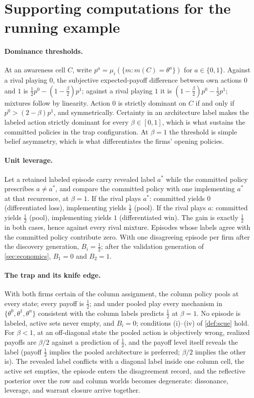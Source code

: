 \section{Supporting computations for the running example}
\label{app:example}

\paragraph{Dominance thresholds.}
At an awareness cell $C$, write $p^a=\mu_i(\{m:m(C)=\theta^a\})$ for
$a\in\{0,1\}$.  Against a rival playing $0$, the subjective expected-payoff
difference between own actions $0$ and $1$ is
$\tfrac12p^0-(1-\tfrac{\beta}{2})p^1$; against a rival playing $1$ it is
$(1-\tfrac{\beta}{2})p^0-\tfrac12p^1$; mixtures follow by linearity.  Action
$0$ is strictly dominant on $C$ if and only if $p^0>(2-\beta)p^1$, and
symmetrically.  Certainty in an architecture label makes the labeled action
strictly dominant for every $\beta\in[0,1]$, which is what sustains the
committed policies in the trap configuration.  At $\beta=1$ the threshold is
simple belief asymmetry, which is what differentiates the firms' opening
policies.

\paragraph{Unit leverage.}
Let a retained labeled episode carry revealed label $a^{*}$ while the
committed policy prescribes $a\neq a^{*}$, and compare the committed policy
with one implementing $a^{*}$ at that recurrence, at $\beta=1$.  If the
rival plays $a^{*}$: committed yields $0$ (differentiated loss),
implementing yields $\tfrac12$ (pool).  If the rival plays $a$: committed
yields $\tfrac12$ (pool), implementing yields $1$ (differentiated win).  The
gain is exactly $\tfrac12$ in both cases, hence against every rival mixture.
Episodes whose labels agree with the committed policy contribute zero.  With
one disagreeing episode per firm after the discovery generation,
$B_i=\tfrac12$; after the validation generation of \cref{sec:economics},
$B_1=0$ and $B_2=1$.

\paragraph{The trap and its knife edge.}
With both firms certain of the column assignment, the column policy pools at
every state; every payoff is $\tfrac12$; and under pooled play every
mechanism in $\{\theta^0,\theta^1,\theta^n\}$ consistent with the column
labels predicts $\tfrac12$ at $\beta=1$.  No episode is labeled, active sets
never empty, and $B_i=0$; conditions (i)--(iv) of \cref{def:scue} hold.  For
$\beta<1$, at an off-diagonal state the pooled action is objectively wrong,
realized payoffs are $\beta/2$ against a prediction of $\tfrac12$, and the
payoff level itself reveals the label (payoff $\tfrac12$ implies the pooled
architecture is preferred; $\beta/2$ implies the other is).  The revealed
label conflicts with a diagonal label inside one column cell, the active set
empties, the episode enters the disagreement record, and the reflective
posterior over the row and column worlds becomes degenerate: dissonance,
leverage, and warrant closure arrive together.


